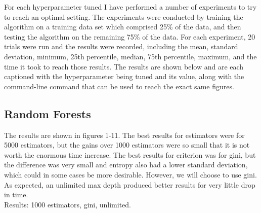 \documentclass{article}
\begin{document}
For each hyperparameter tuned I have performed a number of experiments to try to reach an optimal setting. The experiments were conducted by training the algorithm on a training data set which comprised 25\% of the data, and then testing the algorithm on the remaining 75\% of the data. For each experiment, 20 trials were run and the results were recorded, including the mean, standard deviation, minimum, 25th percentile, median, 75th percentile, maximum, and the time it took to reach those results. The results are shown below and are each captioned with the hyperparameter being tuned and its value, along with the command-line command that can be used to reach the exact same figures.

\subsection{Random Forests}

The results are shown in figures 1-11. The best results for estimators were for 5000 estimators, but the gains over 1000 estimators were so small that it is not worth the enormous time increase. The best results for criterion was for gini, but the difference was very small and entropy also had a lower standard deviation, which could in some cases be more desirable. However, we will choose to use gini. As expected, an unlimited max depth produced better results for very little drop in time.\\

Results: 1000 estimators, gini, unlimited.
\end{document}
